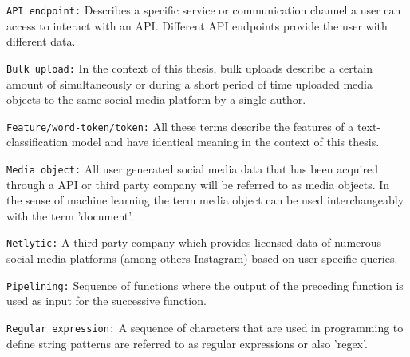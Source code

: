 \texttt{API endpoint:} Describes a specific service or communication channel a user can access to interact with an API. Different API endpoints provide the user with different data.
\newline

\texttt{Bulk upload:} In the context of this thesis, bulk uploads describe a certain amount of simultaneously or during a short period of time uploaded media objects to the same social media platform by a single author.
\newline

\texttt{Feature/word-token/token:} All these terms describe the features of a text-classification model and have identical meaning in the context of this thesis.
\newline

\texttt{Media object:} All user generated social media data that has been acquired through a API or third party company will be referred to as media objects. In the sense of machine learning the term media object can be used interchangeably with the term 'document'.
\newline

\texttt{Netlytic:} A third party company which provides licensed data of numerous social media platforms (among others Instagram) based on user specific queries.
\newline

\texttt{Pipelining:} Sequence of functions where the output of the preceding function is used as input for the successive function.

\texttt{Regular expression:} A sequence of characters that are used in programming to define string patterns are referred to as regular expressions or also 'regex'.

\cleardoublepage

